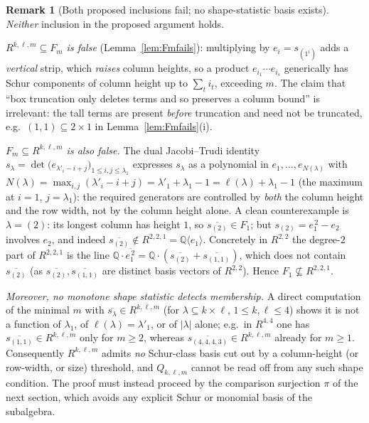 \documentclass{amsart}
\theoremstyle{definition}
\newtheorem{remark}{Remark}
\newcommand{\Q}{\mathbb{Q}}
\newcommand{\Rklm}{R^{k,\ell,m}}
\begin{document}
\begin{remark}[Both proposed inclusions fail; no shape-statistic basis exists]\label{rem:whatswrong}
\emph{Neither} inclusion in the proposed argument holds.

\emph{$\Rklm\subseteq F_m$ is false} (Lemma~\ref{lem:Fmfails}): multiplying by
$e_i=s_{(1^i)}$ adds a \emph{vertical} strip, which \emph{raises} column heights, so a
product $e_{i_1}\cdots e_{i_s}$ generically has Schur components of column height up to
$\sum_t i_t$, exceeding $m$. The claim that ``box truncation only deletes terms and so
preserves a column bound'' is irrelevant: the tall terms are present \emph{before}
truncation and need not be truncated, e.g.\ $(1,1)\subseteq2\times1$ in
Lemma~\ref{lem:Fmfails}(i).

\emph{$F_m\subseteq\Rklm$ is also false.} The dual Jacobi--Trudi identity
$s_\lambda=\det\bigl(e_{\lambda'_i-i+j}\bigr)_{1\le i,j\le\lambda_1}$ expresses
$s_\lambda$ as a polynomial in $e_1,\dots,e_{N(\lambda)}$ with
$N(\lambda)=\max_{i,j}(\lambda'_i-i+j)=\lambda'_1+\lambda_1-1=\ell(\lambda)+\lambda_1-1$
(the maximum at $i=1$, $j=\lambda_1$): the required generators are controlled by
\emph{both} the column height and the row width, not by the column height alone.
A clean counterexample is $\lambda=(2)$: its longest column has height $1$, so
$\overline{s_{(2)}}\in F_1$; but $s_{(2)}=e_1^{\,2}-e_2$ involves $e_2$, and indeed
$\overline{s_{(2)}}\notin R^{2,2,1}=\Q\langle e_1\rangle$. Concretely in $R^{2,2}$ the
degree-$2$ part of $R^{2,2,1}$ is the line
$\Q\cdot\overline{e_1^{\,2}}=\Q\cdot(\overline{s_{(2)}}+\overline{s_{(1,1)}})$, which
does not contain $\overline{s_{(2)}}$ (as $\overline{s_{(2)}},\overline{s_{(1,1)}}$ are
distinct basis vectors of $R^{2,2}$). Hence $F_1\not\subseteq R^{2,2,1}$.

\emph{Moreover, no monotone shape statistic detects membership.} A direct computation
of the minimal $m$ with $\overline{s_\lambda}\in\Rklm$ (for $\lambda\subseteq
k\times\ell$, $1\le k,\ell\le4$) shows it is not a function of $\lambda_1$, of
$\ell(\lambda)=\lambda'_1$, or of $|\lambda|$ alone; e.g.\ in $R^{4,4}$ one has
$\overline{s_{(1,1)}}\in\Rklm$ only for $m\ge2$, whereas
$\overline{s_{(4,4,4,3)}}\in\Rklm$ already for $m\ge1$. Consequently $\Rklm$ admits
\emph{no} Schur-class basis cut out by a column-height (or row-width, or size)
threshold, and $Q_{k,\ell,m}$ cannot be read off from any such shape condition. The
proof must instead proceed by the comparison surjection $\pi$ of the next section,
which avoids any explicit Schur or monomial basis of the subalgebra.
\end{remark}
\end{document}
